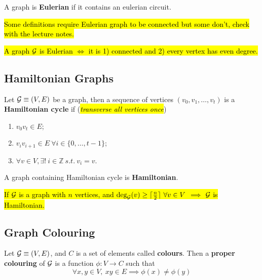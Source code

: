 \documentclass{article}
\def\Z{{\mathbb Z}}
\begin{document}
			\begin{definition}
				A graph is \textbf{Eulerian} if it contains an eulerian circuit.
			\end{definition}
			
			\begin{remark}
				\hl{Some definitions require Eulerian graph to be connected but some don't, check with the lecture notes.}
			\end{remark}
			
			\begin{theorem}
				\hl{A graph $\mathcal{{G}}$ is Eulerian $\iff$ it is 1) connected and 2) every vertex has even degree.}
			\end{theorem}
		
		\subsection{Hamiltonian Graphs}
			\begin{definition}
				Let $\mathcal{{G}} \equiv (V, E)$ be a graph, then a sequence of vertices $(v_0, v_1, \dots, v_t)$ is a \textbf{Hamiltonian cycle} if (\hl{\emph{transverse all vertices once}})
				\begin{enumerate}
					\item $v_0 v_t \in E$;
					\item $v_i v_{i+1} \in E\ \forall i \in \{0, \dots, t-1\}$;
					\item $\forall v \in V, \exists!\ i \in \Z\ s.t.\ v_i = v$.
				\end{enumerate}
			\end{definition}
			
			\begin{definition}
				A graph containing Hamiltonian cycle is \textbf{Hamiltonian}.
			\end{definition}
			
			\begin{theorem}
				\hl{If $\mathcal{{G}}$ is a graph with $n$ vertices, and $\text{{deg}}_{\mathcal{{G}}}(v) \geq \lceil \frac{n}{2} \rceil\ \forall v \in V$ $\implies$ $\mathcal{{G}}$ is Hamiltonian.}
			\end{theorem}
			
		\subsection{Graph Colouring}
			\begin{definition}
				Let $\mathcal{{G}} \equiv (V, E)$, and $C$ is a set of elements called \textbf{colours}. Then a \textbf{proper colouring} of $\mathcal{{G}}$ is a function $\phi:V \to C$ such that 
				\begin{equation}
					\forall x, y \in V,\ xy \in E \implies \phi(x) \neq \phi(y)
				\end{equation}
			\end{definition}
			
\end{document}
